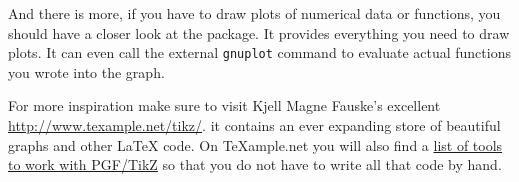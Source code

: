 And there is more, if you have to draw plots of numerical data or
functions, you should have a closer look at the  
package. It provides everything you need to draw plots. It can even
call the external \texttt{gnuplot} command to evaluate actual
functions you wrote into the graph.

For more inspiration make sure to visit Kjell Magne Fauske's excellent
\url{http://www.texample.net/tikz/}. it contains an ever expanding store of
beautiful graphs and other \LaTeX{} code. On \TeX{}ample.net you will also
find a
 \href{http://www.texample.net/tikz/resources/#tools-that-generate-pgftikz-code}{list
 of tools to work with PGF/TikZ} so that you do not have to write all that
 code by hand.

